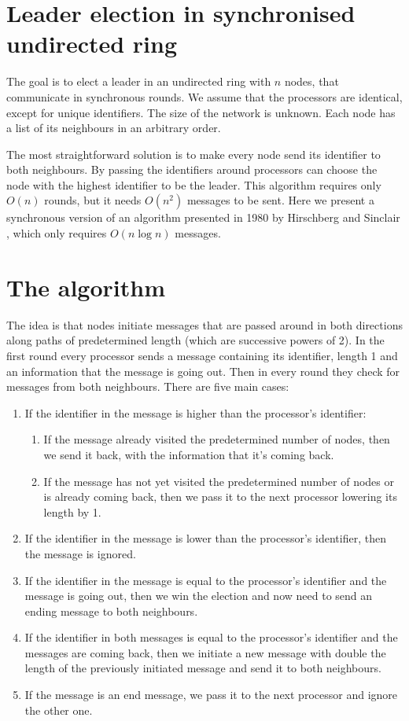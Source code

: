 \documentclass[a4paper,12pt]{article}
\begin{document}
\section{Leader election in synchronised undirected ring}
The goal is to elect a leader in an undirected ring with $n$ nodes, that communicate in synchronous rounds. We assume that the processors are identical, except for unique identifiers. The size of the network is unknown. Each node has a list of its neighbours in an arbitrary order.\par
The most straightforward solution is to make every node send its identifier to both neighbours. By passing the identifiers around processors can choose the node with the highest identifier to be the leader. This algorithm requires only $O(n)$ rounds, but it needs $O(n^2)$ messages to be sent. Here we present a synchronous version \cite{Iványi+2014+54+1} of an algorithm presented in 1980 by Hirschberg and Sinclair \cite{10.1145/359024.359029}, which only requires $O(n\log n)$ messages.

\section{The algorithm}
The idea is that nodes initiate messages that are passed around in both directions along paths of predetermined length (which are successive powers of 2). In the first round every processor sends a message containing its identifier, length 1 and an information that the message is going out. Then in every round they check for messages from both neighbours. There are five main cases:
\begin{enumerate}
    \item If the identifier in the message is higher than the processor's identifier:
    \begin{enumerate}
        \item If the message already visited the predetermined number of nodes, then we send it back, with the information that it's coming back.
        \item If the message has not yet visited the predetermined number of nodes or is already coming back, then we pass it to the next processor lowering its length by 1.
    \end{enumerate}
    \item If the identifier in the message is lower than the processor's identifier, then the message is ignored.
    \item If the identifier in the message is equal to the processor's identifier and the message is going out, then we win the election and now need to send an ending message to both neighbours.
    \item If the identifier in both messages is equal to the processor's identifier and the messages are coming back, then we initiate a new message with double the length of the previously initiated message and send it to both neighbours.
    \item If the message is an end message, we pass it to the next processor and ignore the other one.
\end{enumerate}
\end{document}
